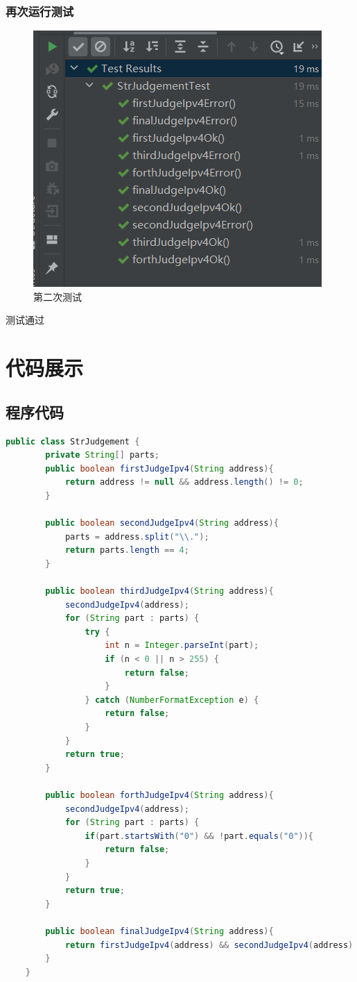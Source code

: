 \documentclass[a4paper]{article}
\begin{document}
\subsubsection*{再次运行测试}
\begin{figure}[h]
    \centering
    \includegraphics[scale=0.7]{5.7.png}
    \caption{第二次测试}
    \label{fig:26}
\end{figure}
测试通过

\section{代码展示}
\subsection{程序代码}
\begin{lstlisting}[language={java}]
    public class StrJudgement {
        private String[] parts;
        public boolean firstJudgeIpv4(String address){
            return address != null && address.length() != 0;
        }

        public boolean secondJudgeIpv4(String address){
            parts = address.split("\\.");
            return parts.length == 4;
        }

        public boolean thirdJudgeIpv4(String address){
            secondJudgeIpv4(address);
            for (String part : parts) {
                try {
                    int n = Integer.parseInt(part);
                    if (n < 0 || n > 255) {
                        return false;
                    }
                } catch (NumberFormatException e) {
                    return false;
                }
            }
            return true;
        }

        public boolean forthJudgeIpv4(String address){
            secondJudgeIpv4(address);
            for (String part : parts) {
                if(part.startsWith("0") && !part.equals("0")){
                    return false;
                }
            }
            return true;
        }

        public boolean finalJudgeIpv4(String address){
            return firstJudgeIpv4(address) && secondJudgeIpv4(address) && thirdJudgeIpv4(address) && forthJudgeIpv4(address);
        }
    }
\end{lstlisting}
\end{document}
